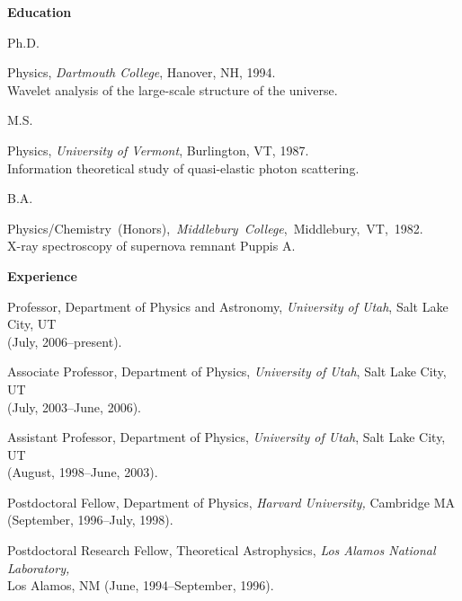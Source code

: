 \documentclass[11pt]{article}
\newcommand{\shead}[1]{\vspace{12.5pt}\centerline{{\bf{#1}}}}
\begin{document}
\vspace{11pt}
\shead{Education}

\hspace*{0.6in}%
{\mbox{}}
\parbox[t]{5.5in}{%
\parbox[t]{0.3999in}{Ph.D.} Physics, 
{\em Dartmouth College}, Hanover, NH, 1994.\\
\hspace*{0.5in}{\em Thesis:}
{Wavelet analysis of the large-scale structure of the universe.} \\
%
\parbox[t]{0.3999in}{M.S.}%
Physics, {\em University of Vermont}, Burlington, VT, 1987. \\
\hspace*{0.5in}{\em Thesis:}
{Information theoretical study of quasi-elastic photon 
scattering.} \\
%
\parbox[t]{0.3999in}{B.A.}%
\mbox{Physics/Chemistry (Honors), {\em Middlebury College}, Middlebury, 
VT, 1982.} \\
\hspace*{0.5in}{\em Thesis:}
{X-ray spectroscopy of supernova remnant Puppis A.}
}

\vspace{11pt}
\shead{Experience}

\begin{list}{\mbox{}}{%
\setlength{\partopsep}{0.0in}%
\setlength{\itemindent}{-0.5in}%
\setlength{\leftmargin}{0.7in}%
\setlength{\parsep}{-2.75pt}
}
\vspace{-7.75pt}
\item Professor, Department of Physics and Astronomy,
{\em University of Utah}, Salt Lake City, UT\\
(July, 2006--present).
%
\item Associate Professor, Department of Physics,
{\em University of Utah}, Salt Lake City, UT\\
(July, 2003--June, 2006).
%
\item Assistant Professor, Department of Physics,
{\em University of Utah}, Salt Lake City, UT\\
({August, 1998--June, 2003}).
%
\item Postdoctoral Fellow, 
Department of Physics,
{\em Harvard University,} Cambridge MA\\
({September, 1996--July, 1998}). 
%
\item Postdoctoral Research Fellow, 
Theoretical Astrophysics,
{\em Los Alamos National Laboratory,} \\
Los Alamos, NM ({June, 1994--September, 1996}). 
\end{list}
\end{document}
